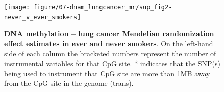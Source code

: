 \documentclass[11pt,oneside]{bristolthesis}
\begin{document}
\begin{figure}

{\centering \texttt{[image: figure/07-dnam\_lungcancer\_mr/sup\_fig2-never\_v\_ever\_smokers]} 

}

\caption[DNA methylation -- lung cancer Mendelian randomization effect estimates in ever and never smokers]{\textbf{DNA methylation -- lung cancer Mendelian randomization effect estimates in ever and never smokers}. On the left-hand side of each column the bracketed numbers represent the number of instrumental variables for that CpG site. * indicates that the SNP(s) being used to instrument that CpG site are more than 1MB away from the CpG site in the genome (trans).}\label{fig:sup-fig2-07}
\end{figure}
\end{document}
